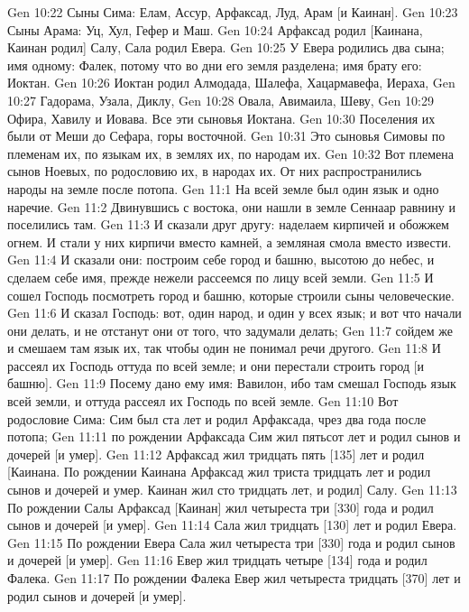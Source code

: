 \vs Gen 10:22 Сыны Сима: Елам, Ассур, Арфаксад, Луд, Арам [и Каинан].
\vs Gen 10:23 Сыны Арама: Уц, Хул, Гефер и Маш.
\vs Gen 10:24 Арфаксад родил [Каинана, Каинан родил] Салу, Сала родил Евера.
\vs Gen 10:25 У Евера родились два сына; имя одному: Фалек, потому что во дни его земля разделена; имя брату его: Иоктан.
\vs Gen 10:26 Иоктан родил Алмодада, Шалефа, Хацармавефа, Иераха,
\vs Gen 10:27 Гадорама, Узала, Диклу,
\vs Gen 10:28 Овала, Авимаила, Шеву,
\vs Gen 10:29 Офира, Хавилу и Иовава. Все эти сыновья Иоктана.
\vs Gen 10:30 Поселения их были от Меши до Сефара, горы восточной.
\vs Gen 10:31 Это сыновья Симовы по племенам их, по языкам их, в землях их, по народам их.
\vs Gen 10:32 Вот племена сынов Ноевых, по родословию их, в народах их. От них распространились народы на земле после потопа.
\vs Gen 11:1 На всей земле был один язык и одно наречие.
\vs Gen 11:2 Двинувшись с востока, они нашли в земле Сеннаар равнину и поселились там.
\vs Gen 11:3 И сказали друг другу: наделаем кирпичей и обожжем огнем. И стали у них кирпичи вместо камней, а земляная смола вместо извести.
\vs Gen 11:4 И сказали они: построим себе город и башню, высотою до небес, и сделаем себе имя, прежде нежели рассеемся по лицу всей земли.
\vs Gen 11:5 И сошел Господь посмотреть город и башню, которые строили сыны человеческие.
\vs Gen 11:6 И сказал Господь: вот, один народ, и один у всех язык; и вот что начали они делать, и не отстанут они от того, что задумали делать;
\vs Gen 11:7 сойдем же и смешаем там язык их, так чтобы один не понимал речи другого.
\vs Gen 11:8 И рассеял их Господь оттуда по всей земле; и они перестали строить город [и башню].
\vs Gen 11:9 Посему дано ему имя: Вавилон, ибо там смешал Господь язык всей земли, и оттуда рассеял их Господь по всей земле.
\rsbpar\vs Gen 11:10 Вот родословие Сима: Сим был ста лет и родил Арфаксада, чрез два года после потопа;
\vs Gen 11:11 по рождении Арфаксада Сим жил пятьсот лет и родил сынов и дочерей [и умер].
\vs Gen 11:12 Арфаксад жил тридцать пять [135] лет и родил [Каинана. По рождении Каинана Арфаксад жил триста тридцать лет и родил сынов и дочерей и умер. Каинан жил сто тридцать лет, и родил] Салу.
\vs Gen 11:13 По рождении Салы Арфаксад [Каинан] жил четыреста три [330] года и родил сынов и дочерей [и умер].
\vs Gen 11:14 Сала жил тридцать [130] лет и родил Евера.
\vs Gen 11:15 По рождении Евера Сала жил четыреста три [330] года и родил сынов и дочерей [и умер].
\vs Gen 11:16 Евер жил тридцать четыре [134] года и родил Фалека.
\vs Gen 11:17 По рождении Фалека Евер жил четыреста тридцать [370] лет и родил сынов и дочерей [и умер].
